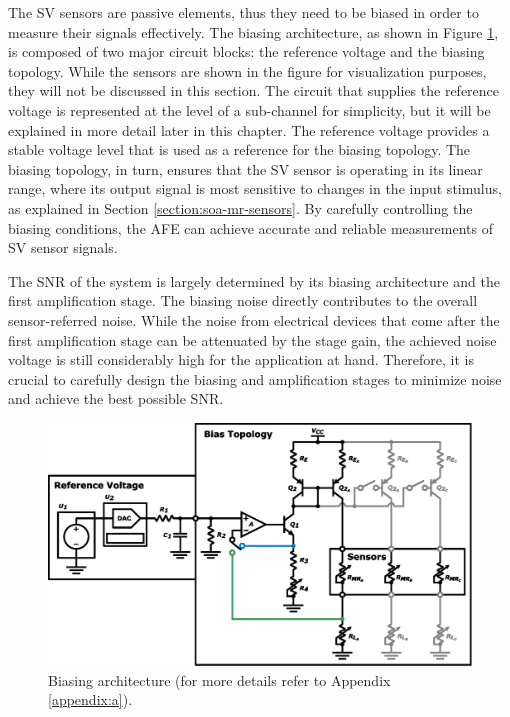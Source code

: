 The \ac{SV} sensors are passive elements, thus they need to be biased in order to measure their signals effectively. The biasing architecture, as shown in Figure \ref{figure:bias-full}, is composed of two major circuit blocks: the reference voltage and the biasing topology. While the sensors are shown in the figure for visualization purposes, they will not be discussed in this section. The circuit that supplies the reference voltage is represented at the level of a sub-channel for simplicity, but it will be explained in more detail later in this chapter. The reference voltage provides a stable voltage level that is used as a reference for the biasing topology. The biasing topology, in turn, ensures that the \ac{SV} sensor is operating in its linear range, where its output signal is most sensitive to changes in the input stimulus, as explained in Section \ref{section:soa-mr-sensors}. By carefully controlling the biasing conditions, the \ac{AFE} can achieve accurate and reliable measurements of \ac{SV} sensor signals.

The \ac{SNR} of the system is largely determined by its biasing architecture and the first amplification stage. The biasing noise directly contributes to the overall sensor-referred noise. While the noise from electrical devices that come after the first amplification stage can be attenuated by the stage gain, the achieved noise voltage is still considerably high for the application at hand. Therefore, it is crucial to carefully design the biasing and amplification stages to minimize noise and achieve the best possible \ac{SNR}.

\begin{figure}[!ht]
    \centering
    \includegraphics[width=.95\textwidth]{images/chapter_4/channel/bias_full.eps}
    \caption{Biasing architecture (for more details refer to Appendix \ref{appendix:a}).}
    \label{figure:bias-full}
\end{figure}


